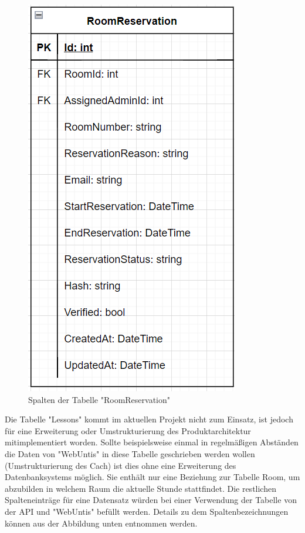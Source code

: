 \begin{figure}[H]
    \centering
    \includegraphics{media/MariaDB/RoomReservation.png}
    \caption{Spalten der Tabelle "RoomReservation"}
\end{figure}


Die Tabelle "Lessons" kommt im aktuellen Projekt nicht zum Einsatz, ist jedoch für eine Erweiterung oder Umstrukturierung des Produktarchitektur mitimplementiert worden. Sollte beispielsweise einmal in regelmäßigen Abständen die Daten von "WebUntis" in diese Tabelle geschrieben werden wollen (Umstrukturierung des Cach) ist dies ohne eine Erweiterung des Datenbanksystems möglich. Sie enthält nur eine Beziehung zur Tabelle Room, um abzubilden in welchem Raum die aktuelle Stunde stattfindet. Die restlichen Spalteneinträge für eine Datensatz würden bei einer Verwendung der Tabelle von der API und "WebUntis" befüllt werden. Details zu dem Spaltenbezeichnungen können aus der Abbildung unten entnommen werden.

